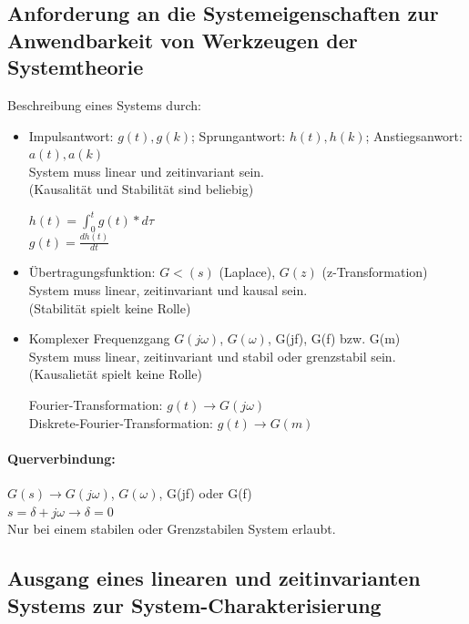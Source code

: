 \documentclass{article}
\begin{document}
\subsection*{Anforderung an die Systemeigenschaften zur Anwendbarkeit von Werkzeugen der Systemtheorie}
Beschreibung eines Systems durch:
\begin{itemize}
	\item Impulsantwort: $g(t), g(k)$; Sprungantwort: $h(t), h(k)$; Anstiegsanwort: $a(t), a(k)$ \\
	System muss linear und zeitinvariant sein. \\
	(Kausalität und Stabilität sind beliebig)
	\begin{center}
		$h(t) = \int_{0}^{t}g(t)*d\tau$ \\
		$g(t) = \frac{dh(t)}{dt}$
	\end{center}
	
	\item Übertragungsfunktion: $G<(s)$ (Laplace), $G(z)$ (z-Transformation) \\
	System muss linear, zeitinvariant und kausal sein. \\
	(Stabilität spielt keine Rolle)

	\item Komplexer Frequenzgang $G(j\omega)$, $G(\omega)$, G(jf), G(f) bzw. G(m) \\
	System muss linear, zeitinvariant und stabil oder grenzstabil sein. \\
	(Kausalietät spielt keine Rolle)
	\begin{center}
		Fourier-Transformation: $g(t) \rightarrow G(j\omega)$ \\
		Diskrete-Fourier-Transformation: $g(t) \rightarrow G(m)$
	\end{center}
\end{itemize}

\paragraph{Querverbindung:}
$G(s) \rightarrow G(j\omega)$, $G(\omega)$,  G(jf) oder G(f) \\
$s=\delta + j\omega \rightarrow \delta = 0$\\
Nur bei einem stabilen oder Grenzstabilen System erlaubt.

\subsection*{Ausgang eines linearen und zeitinvarianten Systems zur System-Charakterisierung}
\end{document}
